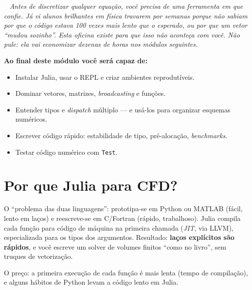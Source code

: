 \documentclass[10pt,a4paper,twocolumn,openany]{report}
\newcommand{\lead}[2]{\par\medskip\noindent{\color{#1}\bfseries #2}\ }
\newenvironment{conceito}[1]{\section{#1}}{\par}
\newenvironment{professor}{\lead{laranja}{Nota do professor.}\itshape}{\par\medskip}
\newcommand{\objetivos}{\noindent\textbf{Ao final deste módulo você será capaz de:}}
\begin{document}
\begin{professor}
Antes de discretizar qualquer equação, você precisa de uma ferramenta em que
confie. Já vi alunos brilhantes em física travarem por semanas porque não
sabiam por que o código estava 100 vezes mais lento que o esperado, ou por
que um vetor ``mudou sozinho''. Esta oficina existe para que isso não
aconteça com você. Não pule: ela vai economizar dezenas de horas nos módulos
seguintes.
\end{professor}

\objetivos
\begin{itemize}
  \item Instalar Julia, usar o REPL e criar ambientes reprodutíveis.
  \item Dominar vetores, matrizes, \emph{broadcasting} e funções.
  \item Entender tipos e \emph{dispatch} múltiplo --- e usá-los para
        organizar esquemas numéricos.
  \item Escrever código rápido: estabilidade de tipo, pré-alocação,
        \emph{benchmarks}.
  \item Testar código numérico com \texttt{Test}.
\end{itemize}

\begin{conceito}{Por que Julia para CFD?}
O ``problema das duas linguagens'': prototipa-se em Python ou MATLAB
(fácil, lento em laços) e reescreve-se em C/Fortran (rápido, trabalhoso).
Julia compila cada função para código de máquina na primeira chamada
(\emph{JIT}, via LLVM), especializada para os tipos dos argumentos. Resultado:
\textbf{laços explícitos são rápidos}, e você escreve um solver de volumes
finitos ``como no livro'', sem truques de vetorização.

O preço: a primeira execução de cada função é mais lenta (tempo de
compilação), e alguns hábitos de Python levam a código lento em Julia.
\end{conceito}
\end{document}
